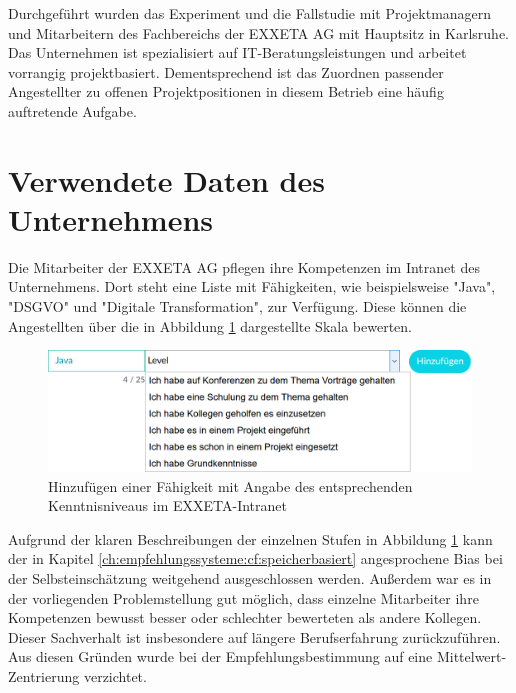 Durchgeführt wurden das Experiment und die Fallstudie mit Projektmanagern und Mitarbeitern des Fachbereichs \JES der EXXETA AG mit Hauptsitz in Karlsruhe. Das Unternehmen ist spezialisiert auf IT-Beratungsleistungen und arbeitet vorrangig projektbasiert. Dementsprechend ist das Zuordnen passender Angestellter zu offenen Projektpositionen in diesem Betrieb eine häufig auftretende Aufgabe.

\section{Verwendete Daten des Unternehmens}
\label{ch:methodik:versuchsaufbau}
Die Mitarbeiter der EXXETA AG pflegen ihre Kompetenzen im Intranet des Unternehmens. Dort steht eine Liste mit \anzFaehigkeiten Fähigkeiten, wie beispielsweise "Java", "DSGVO" und "Digitale Transformation", zur Verfügung. Diese können die Angestellten über die in Abbildung \ref{fig:methodik:versuchsaufbau:daten:abb1} dargestellte Skala bewerten.

\begin{figure}[h]
	\centering
	\includegraphics[width=1\textwidth]{gfx/skill-level.png}
	\caption{Hinzufügen einer Fähigkeit mit Angabe des entsprechenden Kenntnisniveaus im EXXETA-Intranet}
	\label{fig:methodik:versuchsaufbau:daten:abb1}
\end{figure}

Aufgrund der klaren Beschreibungen der einzelnen Stufen in Abbildung \ref{fig:methodik:versuchsaufbau:daten:abb1} kann der in Kapitel \ref{ch:empfehlungssysteme:cf:speicherbasiert} angesprochene Bias bei der Selbsteinschätzung weitgehend ausgeschlossen werden. Außerdem war es in der vorliegenden Problemstellung gut möglich, dass einzelne Mitarbeiter ihre Kompetenzen bewusst besser oder schlechter bewerteten als andere Kollegen. Dieser Sachverhalt ist insbesondere auf längere Berufserfahrung zurückzuführen. Aus diesen Gründen wurde bei der Empfehlungsbestimmung auf eine Mittelwert-Zentrierung verzichtet.

